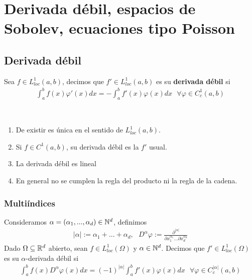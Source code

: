 \documentclass[12pt]{book}
\begin{document}
    \section{Derivada débil, espacios de Sobolev, ecuaciones tipo Poisson}

    \subsection{Derivada débil}

    \begin{definicion}
        Sea $f\in L_{loc}^1(a,b)$, decimos que $f'\in L_{loc}^1(a,b)$ es su \textbf{derivada débil} si 
        \begin{gather*}
            \int_{a}^{b} f(x)\varphi'(x) dx = - \int_a^b f'(x)\varphi(x) dx \ \ \ \forall \varphi \in C_c^1(a,b)
        \end{gather*}
    \end{definicion}
    \begin{propiedades}\
        \begin{enumerate}
            \item De existir es única en el sentido de $L_{loc}^1(a,b)$.
            \item Si $f\in C^1(a,b)$, su derivada débil es la $f'$ usual.
            \item La derivada débil es lineal
            \item En general no se cumplen la regla del producto ni la regla de la cadena.
        \end{enumerate}
    \end{propiedades}

    \subsubsection{Multiíndices}

    \begin{definicion}
        Consideramos $\alpha = (\alpha_1, ..., \alpha_d)\in \mathbb{N}^d$, definimos
        \begin{gather*}
            |\alpha| := \alpha_1 + ... + \alpha_d,\ \ \ D^\alpha\varphi := \frac{\partial^{|\alpha|}}{\partial x_1^{\alpha_1}\dots \partial x_d^{\alpha_d}}
        \end{gather*}
        Dado $\Omega \subseteq \mathbb{R}^d$ abierto, sean $f\in L_{loc}^1(\Omega)$ y $\alpha \in \mathbb{N}^d$. Decimos que $f'\in L_{loc}^1(\Omega)$ es su $\alpha$-derivada débil si
        \begin{gather*}
                \int_{a}^{b} f(x)D^{\alpha}\varphi(x) dx = (-1)^{|\alpha|} \int_a^b f'(x)\varphi(x) dx \ \ \ \forall \varphi \in C_c^{|\alpha|}(a,b)
        \end{gather*}
    \end{definicion}
\end{document}
